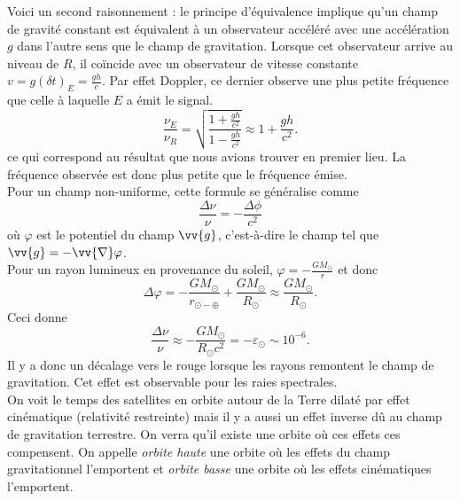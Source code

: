 \documentclass[a4paper,11pt]{report}
\theoremstyle{definition}
\theoremstyle{plain}
\theoremstyle{definition}
\theoremstyle{remark}
\begin{document}
                Voici un second raisonnement : le principe d'équivalence implique qu'un champ de gravité constant est équivalent à un observateur accéléré avec une accélération $g$ dans l'autre sens que le champ de gravitation. Lorsque cet observateur arrive au niveau de $R$, il coïncide avec un observateur de vitesse constante $v = g(\delta t)_E = \frac{gh}{c}$. Par effet Doppler, ce dernier observe une plus petite fréquence que celle à laquelle $E$ a émit le signal.
                \begin{equation}
                    \frac{\nu_E}{\nu_R} = \sqrt{\frac{1+\frac{gh}{c^2}}{1-\frac{gh}{c^2}}}\approx 1+\frac{gh}{c^2}.
                \end{equation}
                ce qui correspond au résultat que nous avions trouver en premier lieu. La fréquence observée est donc plus petite que le fréquence émise.\\
                Pour un champ non-uniforme, cette formule se généralise comme
                \begin{equation}
                    \frac{\Delta\nu}{\nu} = -\frac{\Delta\phi}{c^2}
                \end{equation}
                où $\varphi$ est le potentiel du champ $\vv{g}$, c'est-à-dire le champ tel que $\vv{g} = -\vv{\nabla}\varphi$.\\
                
                Pour un rayon lumineux en provenance du soleil, $\varphi=-\frac{GM_\odot}{r}$ et donc
                \begin{equation}
                    \Delta\varphi = -\frac{GM_\odot}{r_{\odot-\oplus}} + \frac{GM_\odot}{R_\odot}\approx\frac{GM_\odot}{R_\odot}.
                \end{equation}
                Ceci donne
                \begin{equation}
                    \frac{\Delta\nu}{\nu} \approx - \frac{GM_\odot}{R_\odot c^2} = -\varepsilon_\odot \sim 10^{-6}.
                \end{equation}
                Il y a donc un décalage vers le rouge lorsque les rayons remontent le champ de gravitation. Cet effet est observable pour les raies spectrales.\\
                
                On voit le temps des satellites en orbite autour de la Terre dilaté par effet cinématique (relativité restreinte) mais il y a aussi un effet inverse dû au champ de gravitation terrestre. On verra qu'il existe une orbite où ces effets ces compensent. On appelle \textit{orbite haute} une orbite où les effets du champ gravitationnel l'emportent et \textit{orbite basse} une orbite où les effets cinématiques l'emportent.
    
\end{document}

